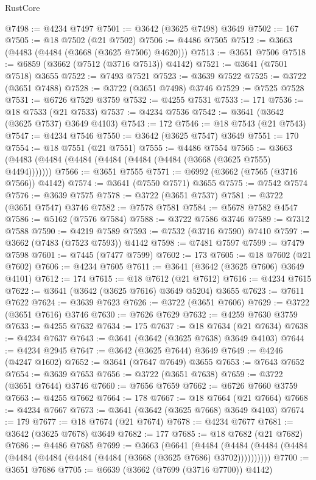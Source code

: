 \begin{lexlean}{RustCore}
\begin{coremodule}
@7498 := @4234 @7497
@7501 := @3642 (@3625 @7498) @3649
@7502 := 167
@7505 := @18 @7502 (@21 @7502)
@7506 := @4486 @7505
@7512 := @3663 (@4483 (@4484 (@3668 (@3625 @7506) @4620)))
@7513 := @3651 @7506
@7518 := @6859 (@3662 (@7512 (@3716 @7513)) @4142)
@7521 := @3641 (@7501 @7518) @3655
@7522 := @7493 @7521
@7523 := @3639 @7522
@7525 := @3722 (@3651 @7488)
@7528 := @3722 (@3651 @7498) @3746
@7529 := @7525 @7528
@7531 := @6726 @7529 @3759
@7532 := @4255 @7531
@7533 := 171
@7536 := @18 @7533 (@21 @7533)
@7537 := @4234 @7536
@7542 := @3641 (@3642 (@3625 @7537) @3649 @4103)
@7543 := 172
@7546 := @18 @7543 (@21 @7543)
@7547 := @4234 @7546
@7550 := @3642 (@3625 @7547) @3649
@7551 := 170
@7554 := @18 @7551 (@21 @7551)
@7555 := @4486 @7554
@7565 := @3663 (@4483 (@4484 (@4484 (@4484 (@4484 (@4484 (@3668 (@3625 @7555) @4494)))))))
@7566 := @3651 @7555
@7571 := @6992 (@3662 (@7565 (@3716 @7566)) @4142)
@7574 := @3641 (@7550 @7571) @3655
@7575 := @7542 @7574
@7576 := @3639 @7575
@7578 := @3722 (@3651 @7537)
@7581 := @3722 (@3651 @7547) @3746
@7582 := @7578 @7581
@7584 := @5678 @7582 @4547
@7586 := @5162 (@7576 @7584)
@7588 := @3722 @7586 @3746
@7589 := @7312 @7588
@7590 := @4219 @7589
@7593 := @7532 (@3716 @7590) @7410
@7597 := @3662 (@7483 (@7523 @7593)) @4142
@7598 := @7481 @7597
@7599 := @7479 @7598
@7601 := @7445 (@7477 @7599)
@7602 := 173
@7605 := @18 @7602 (@21 @7602)
@7606 := @4234 @7605
@7611 := @3641 (@3642 (@3625 @7606) @3649 @4101)
@7612 := 174
@7615 := @18 @7612 (@21 @7612)
@7616 := @4234 @7615
@7622 := @3641 (@3642 (@3625 @7616) @3649 @5204) @3655
@7623 := @7611 @7622
@7624 := @3639 @7623
@7626 := @3722 (@3651 @7606)
@7629 := @3722 (@3651 @7616) @3746
@7630 := @7626 @7629
@7632 := @4259 @7630 @3759
@7633 := @4255 @7632
@7634 := 175
@7637 := @18 @7634 (@21 @7634)
@7638 := @4234 @7637
@7643 := @3641 (@3642 (@3625 @7638) @3649 @4103)
@7644 := @4234 @2945
@7647 := @3642 (@3625 @7644) @3649
@7649 := @4246 (@4247 @1602)
@7652 := @3641 (@7647 @7649) @3655
@7653 := @7643 @7652
@7654 := @3639 @7653
@7656 := @3722 (@3651 @7638)
@7659 := @3722 (@3651 @7644) @3746
@7660 := @7656 @7659
@7662 := @6726 @7660 @3759
@7663 := @4255 @7662
@7664 := 178
@7667 := @18 @7664 (@21 @7664)
@7668 := @4234 @7667
@7673 := @3641 (@3642 (@3625 @7668) @3649 @4103)
@7674 := 179
@7677 := @18 @7674 (@21 @7674)
@7678 := @4234 @7677
@7681 := @3642 (@3625 @7678) @3649
@7682 := 177
@7685 := @18 @7682 (@21 @7682)
@7686 := @4486 @7685
@7699 := @3663
    (@6641
      (@4484 (@4484 (@4484 (@4484 (@4484 (@4484 (@4484 (@4484 (@3668 (@3625 @7686) @3702))))))))))
@7700 := @3651 @7686
@7705 := @6639 (@3662 (@7699 (@3716 @7700)) @4142)

\end{coremodule}
\end{lexlean}
